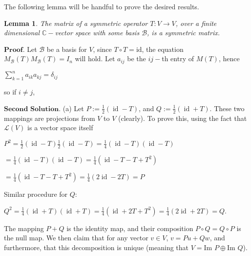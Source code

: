 \documentclass{article}
\newtheorem{lemma}{Lemma}
\theoremstyle{remark}
\begin{document}
\begin{enumerate}
        The following lemma will be handful to prove the desired results.
        \begin{lemma}
            The matrix of a symmetric operator $T: V\to V$, over a finite dimensional $\mathbb{C}-$vector space with some basis $\mathcal{B}$,
            is a symmetric matrix.
        \end{lemma}
        $\textbf{Proof.}$
        Let $\mathcal{B}$ be a basis for $V$, since $T \circ T = \text{id}$, the equation $M_{\mathcal{B}}(T)M_{\mathcal{B}}(T) = I_n$ will hold.
        Let $a_{ij}$ be the $ij-$th entry of $M(T)$, hence
        \begin{center}
            $\displaystyle \sum_{k=1}^{n} a_{ik}a_{kj} = \delta_{ij}$
        \end{center}
        so if $i \neq j$, 


        $\textbf{Second Solution.}$
        (a) Let $P := \frac{1}{2}(\operatorname{id}-T)$, and $Q := \frac{1}{2}(\operatorname{id} + T)$.
        These two mappings are projections from $V$ to $V$ (clearly). To prove this, using the fact that $\mathcal{L}(V)$ is a vector space itself
        \begin{center}
            $\displaystyle P^2 = \frac{1}{2}(\operatorname{id} - T)\frac{1}{2}(\operatorname{id} - T) = \frac{1}{4}(\operatorname{id} - T)(\operatorname{id} - T)$
        \end{center}
        \begin{center}
            $\displaystyle = \frac{1}{4}(\operatorname{id} - T)(\operatorname{id} - T) = \frac{1}{4}(\operatorname{id} - T - T + T^2)$
        \end{center}
        \begin{center}
            $\displaystyle = \frac{1}{4}(\operatorname{id} - T - T + T^2) = \frac{1}{4}(2\operatorname{id} - 2T) = P$
        \end{center}
        Similar procedure for $Q$:
        \begin{center}
            $\displaystyle Q^2 = \frac{1}{4}(\operatorname{id} + T)(\operatorname{id} + T) = \frac{1}{4}(\operatorname{id} + 2T + T^2) = \frac{1}{4}(2\operatorname{id} + 2T) = Q$.
        \end{center}
        The mapping $P + Q$ is the identity map, and their composition $P \circ Q = Q \circ P$ is the null map.
        We then claim that for any vector $v \in V$, $v = Pu + Qw$, and furthermore, that this decomposition is unique (meaning that $V = \text{Im }P \oplus \text{Im }Q$).


\end{enumerate}
\end{document}
